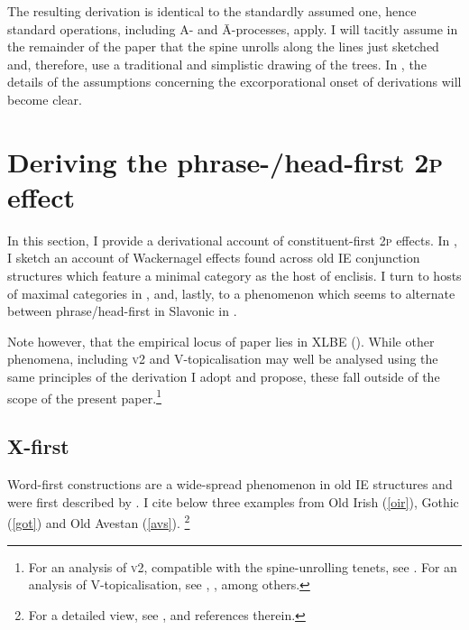 \documentclass[output=paper]{langsci/langscibook}
\begin{document}
The resulting derivation is identical to the standardly assumed one, hence
standard operations, including A- and Ā-processes, apply. I will tacitly assume
in the remainder of the paper that the spine unrolls along the lines just
sketched and, therefore, use a traditional and simplistic drawing of the trees.
In , the details of the assumptions concerning the
excorporational onset of derivations will become clear.

\section{Deriving the phrase-/head-first \textsc{2p} effect}
\label{sec:deriv}

In this section, I provide a derivational account of constituent-first
\textsc{2p} effects. In , I sketch an account of Wackernagel
effects found across old IE conjunction structures which feature a minimal
category as the host of enclisis. I turn to hosts of maximal categories in
, and, lastly, to a phenomenon which seems to alternate
between phrase/head-first in Slavonic in .

Note however, that the empirical locus of paper lies in XLBE
(). While other phenomena, including \textsc{v2} and
V-topicalisation may well be analysed using the same principles of the
derivation I adopt and propose, these fall outside of the scope of the present
paper.\footnote{For an analysis of \textsc{v2}, compatible with the
spine-unrolling tenets, see \citet[Ch. 2]{Shimada:2007}. For an analysis of
V-topicalisation, see \citet{CavarWilder:1992}, \citet{Mitrovic:2017pa}, among
others.}

\subsection{X-first}\label{subsec:X1}

Word-first constructions are a wide-spread phenomenon in old IE
 structures and were first described by
\citet{wackernagel:1892jl}. I cite below three examples from Old Irish
(\ref{oir}), Gothic (\ref{got}) and Old Avestan (\ref{avs}). \footnote{For a
detailed view, see \citeauthor{Mitrovic:2014phd}
\citeyearpar{Mitrovic:2014phd,Mitrovic:2019}, and references therein.}
\end{document}
